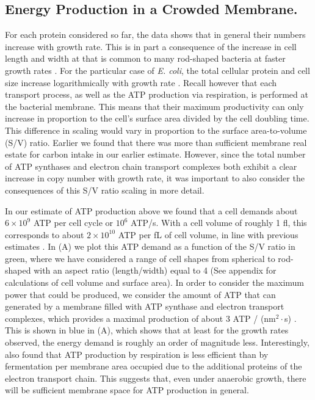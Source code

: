 \subsection{Energy Production in a Crowded Membrane.}

For each protein considered so far, the data shows that in general their numbers
increase with growth rate. This is in part a consequence of the increase in cell
length and width at that is common to many rod-shaped bacteria at faster growth
rates \citep{ojkic2019, harris2018}. For the particular case of \textit{E.
coli}, the total cellular protein and cell size increase logarithmically with
growth rate \citep{schaechter1958, si2017}.
Recall however that each transport process, as well
as the ATP production via respiration, is performed at the bacterial membrane.
This means that their maximum productivity can only increase in proportion to
the cell's surface area divided by the cell doubling time. This difference in
scaling would vary in proportion to the surface area-to-volume (S/V) ratio.
Earlier we found that there was more than sufficient membrane real estate for
carbon intake in our earlier estimate. However, since
the total number of ATP synthases and electron chain transport complexes both exhibit a clear increase in copy number
with growth rate, it was important to also consider
the consequences of this
S/V ratio scaling in more detail.

In our estimate of ATP production above we found that a cell demands about
$6 \times 10^9$ ATP per cell cycle or $10^6$ ATP/s. With a cell volume of roughly 1 fl, this
corresponds to about $2 \times 10^{10}$ ATP per fL of cell volume, in line  with
previous estimates \citep{stouthamer1977, szenk2017}. In  (A)
we plot this ATP demand as a function of the S/V ratio in green, where we have
considered a range of cell shapes from spherical to rod-shaped with an aspect
ratio (length/width) equal to 4 (See appendix for calculations of cell volume
and surface area).  In order to consider the maximum power that could be
produced, we consider the amount of ATP that can generated by a membrane filled
with ATP synthase and electron transport complexes, which provides a maximal
production of about 3 ATP / (nm$^2 \cdot$s) \citep{szenk2017}. This is shown in
blue in (A), which shows that at least for the growth rates
observed, the energy demand is roughly an order of magnitude less.
Interestingly, \cite{szenk2017} also found that ATP production by
respiration is less efficient than by fermentation per membrane area occupied
due to the additional proteins of the electron transport chain. This suggests
that, even under anaerobic growth, there will be sufficient membrane space for
ATP production in general.

